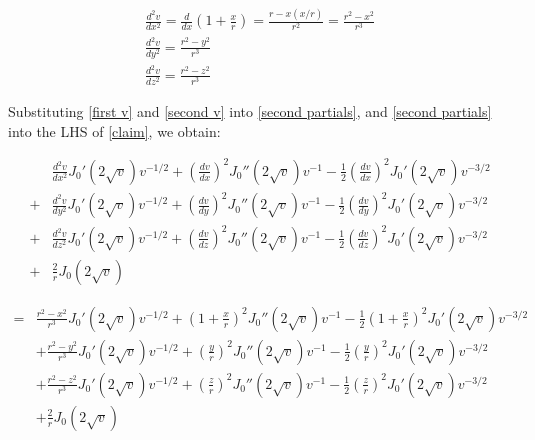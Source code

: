 \documentclass{article}
\begin{document}
\vskip 12pt

\begin{equation}
\label{second v}
\begin{gathered}
\frac{d^2 v}{d x^2} = \frac{d}{d x} \left(1 + \frac{x}{r}\right) = \frac{r - x(x/r)}{r^2} = \frac{r^2 - x^2}{r^3} \\
\frac{d^2 v}{d y^2} = \frac{r^2 - y^2}{r^3} \\
\frac{d^2 v}{d z^2} = \frac{r^2 - z^2}{r^3}
\end{gathered}
\end{equation}

\vskip 20pt

Substituting \eqref{first v} and \eqref{second v} into \eqref{second partials}, and \eqref{second partials}
into the LHS of \eqref{claim}, we obtain:

\begin{equation*}
\begin{aligned}
&\frac{d^2 v}{d x^2} J_0'(2\sqrt{v}) v^{-1/2} + \left(\frac{d v}{d x}\right)^2 J_0''(2\sqrt{v}) v^{-1} - \frac{1}{2} \left(\frac{d v}{d x}\right)^2 J_0'(2\sqrt{v}) v^{-3/2} \\
+& \frac{d^2 v}{d y^2} J_0'(2\sqrt{v}) v^{-1/2} + \left(\frac{d v}{d y}\right)^2 J_0''(2\sqrt{v}) v^{-1} - \frac{1}{2} \left(\frac{d v}{d y}\right)^2 J_0'(2\sqrt{v}) v^{-3/2} \\
+& \frac{d^2 v}{d z^2} J_0'(2\sqrt{v}) v^{-1/2} + \left(\frac{d v}{d z}\right)^2 J_0''(2\sqrt{v}) v^{-1} - \frac{1}{2} \left(\frac{d v}{d z}\right)^2 J_0'(2\sqrt{v}) v^{-3/2} \\
+& \frac{2}{r} J_0(2\sqrt{v})
\end{aligned}
\end{equation*}

\begin{equation*}
\begin{aligned}
=&\frac{r^2-x^2}{r^3} J_0'(2\sqrt{v}) v^{-1/2} + (1+\frac{x}{r})^2 J_0''(2\sqrt{v}) v^{-1} - \frac{1}{2} (1+\frac{x}{r})^2 J_0'(2\sqrt{v}) v^{-3/2} \\
&+ \frac{r^2-y^2}{r^3} J_0'(2\sqrt{v}) v^{-1/2} + \left(\frac{y}{r}\right)^2 J_0''(2\sqrt{v}) v^{-1} - \frac{1}{2} \left(\frac{y}{r}\right)^2 J_0'(2\sqrt{v}) v^{-3/2} \\
&+ \frac{r^2-z^2}{r^3} J_0'(2\sqrt{v}) v^{-1/2} + \left(\frac{z}{r}\right)^2 J_0''(2\sqrt{v}) v^{-1} - \frac{1}{2} \left(\frac{z}{r}\right)^2 J_0'(2\sqrt{v}) v^{-3/2} \\
&+ \frac{2}{r} J_0(2\sqrt{v})
\end{aligned}
\end{equation*}
\end{document}
